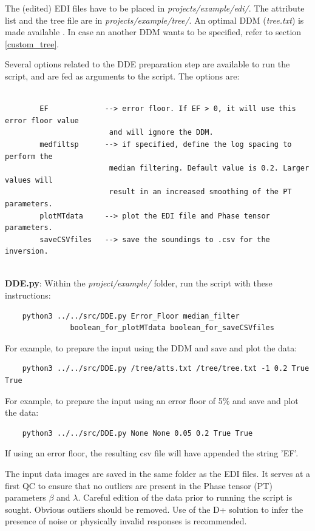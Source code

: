 \documentclass[]{scrartcl}
\begin{document}
	\bigbreak
	The (edited) EDI files have to be placed in \textit{projects/example/edi/}. The attribute list and the tree file are in \textit{projects/example/tree/}. An optimal DDM (\textit{tree.txt}) is made available \citep[see][]{Seille2020a}. In case an another DDM wants to be specified, refer to section \ref{custom_tree}.
	\bigbreak
	
	Several options related to the DDE preparation step are available to run the script, and are fed as arguments to the script.	The options are:
	
	\begin{verbatim}
		
		EF             --> error floor. If EF > 0, it will use this error floor value 
						and will ignore the DDM.
		medfiltsp      --> if specified, define the log spacing to perform the 
						median filtering. Default value is 0.2. Larger values will 
						result in an increased smoothing of the PT parameters.
		plotMTdata     --> plot the EDI file and Phase tensor parameters.
		saveCSVfiles   --> save the soundings to .csv for the inversion.
		
	\end{verbatim}
	
	\textbf{DDE.py}: Within the \textit{project/example/} folder, run the script with these instructions: 
		
	\begin{verbatim}
	python3 ../../src/DDE.py Error_Floor median_filter 
	           boolean_for_plotMTdata boolean_for_saveCSVfiles
	\end{verbatim}
	
	\bigbreak
	For example, to prepare the input using the DDM and save and plot the data:
	\begin{verbatim}
	python3 ../../src/DDE.py /tree/atts.txt /tree/tree.txt -1 0.2 True True
	\end{verbatim} 
	
	\bigbreak
	For example, to prepare the input using an error floor of 5\% and save and plot the data:
	\begin{verbatim}
	python3 ../../src/DDE.py None None 0.05 0.2 True True
	\end{verbatim} 

    If using an error floor, the resulting csv file will have appended the string 'EF'.
	
		
	\bigbreak
	The input data images are saved in the same folder as the EDI files. It serves at a first QC to ensure that no outliers are present in the Phase tensor (PT) parameters $\beta$ and $\lambda$. Careful edition of the data prior to running the script is sought. Obvious outliers should be removed. Use of the D+ solution \citep{Beamish1992} to infer the presence of noise or physically invalid responses is recommended.
	
\end{document}
